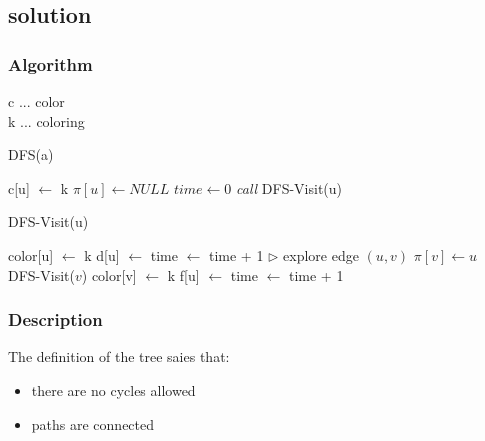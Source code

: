 \subsection{solution}

\renewcommand{\algorithmicforall}{\textbf{for each}}
\subsubsection{Algorithm}
c ... color\\
k ... coloring
\begin{algorithm}[ht]
\small
\caption{DFS(a)}
\begin{algorithmic}
      \STATE c[u] $\gets$ k
      \STATE $\pi[u] \gets NULL$
  \ENDFOR
  \STATE $time \gets 0$
      \STATE \textit{call} DFS-Visit(u)
    \ENDIF
  \ENDFOR
\end{algorithmic}
\end{algorithm}

\begin{algorithm}[ht]
\small
\caption{DFS-Visit(u)}
\begin{algorithmic}
    \STATE color[u] $\gets$ k
    \STATE d[u] $\gets$ time $\gets$ time + 1
       \STATE $\triangleright$ explore edge $(u,v)$
           \STATE $\pi[v] \gets u$
           \STATE DFS-Visit($v$)
       \ENDIF
     \ENDFOR
     \STATE color[v] $\gets$  k
     \STATE f[u] $\gets$ time $\gets$ time + 1
\end{algorithmic}
\end{algorithm}


\subsubsection{Description}
The definition of the tree saies that:
\begin{itemize}
 \item there are no cycles allowed
 \item paths are connected
\end{itemize}
